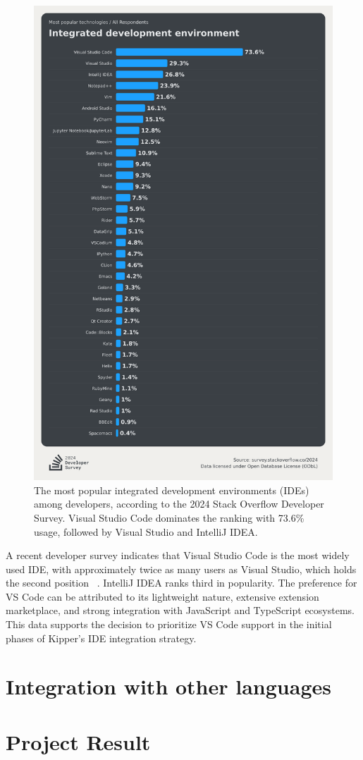 \begin{figure}[h!]
	\centering
	\includegraphics[width=.8\linewidth]{./pics/developersurvey2024.png}
	\caption{The most popular integrated development environments (IDEs) among developers, according to the 2024 Stack Overflow Developer Survey. Visual Studio Code dominates the ranking with 73.6\% usage, followed by Visual Studio and IntelliJ IDEA.}
	\label{fig:future:developersurvey}
\end{figure}

A recent developer survey indicates that Visual Studio Code is the most widely used IDE, with approximately twice as many users as Visual Studio, which holds the second position ~\cite{stackoverflow2024}. IntelliJ IDEA ranks third in popularity. The preference for VS Code can be attributed to its lightweight nature, extensive extension marketplace, and strong integration with JavaScript and TypeScript ecosystems. This data supports the decision to prioritize VS Code support in the initial phases of Kipper’s IDE integration strategy.

\section{Integration with other languages}

\section{Project Result}

